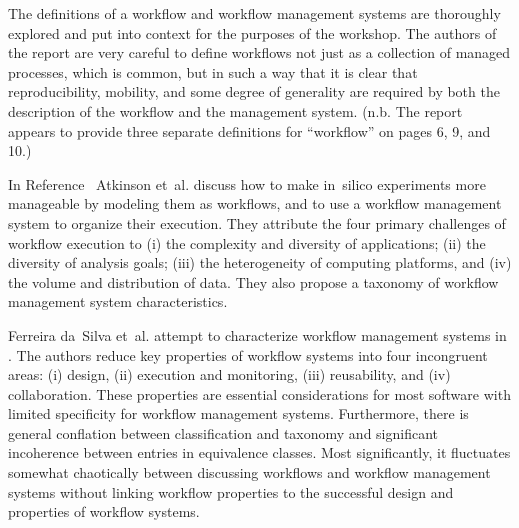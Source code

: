 The definitions of a workflow and workflow management systems are
thoroughly explored and put into context for the purposes of the workshop. The
authors of the report are very careful to define workflows not just as a
collection of managed processes, which is common, but in such a way that it is
clear that reproducibility, mobility, and some degree of generality are required
by both the description of the workflow and the management system. (n.b. The
report appears to provide three separate definitions for ``workflow'' on pages
6, 9, and 10.)


In Reference~\cite{atkinson-csur} Atkinson et~al. discuss how to make in~silico experiments more manageable by modeling them as workflows, and to use a
workflow management system to organize their execution. They attribute the
four primary challenges of workflow execution to (i) the complexity and
diversity of applications; (ii) the diversity of analysis goals; (iii) the
heterogeneity of computing platforms, and (iv) the volume and distribution of
data. They also propose a taxonomy of workflow management system
characteristics.

Ferreira da~Silva et~al. attempt to characterize workflow management systems in
\cite{ferreira_da_silva_characterization_nodate}. The authors reduce key
properties of workflow systems into four incongruent areas: (i) design, (ii)
execution and monitoring, (iii) reusability, and (iv) collaboration. These
properties are essential considerations for most  software with limited
specificity for workflow management systems. Furthermore, there is general
conflation between classification and taxonomy and significant incoherence
between entries in equivalence classes. Most significantly, it fluctuates
somewhat chaotically between discussing workflows and workflow management
systems without linking workflow properties to the successful design and properties
of workflow systems.
